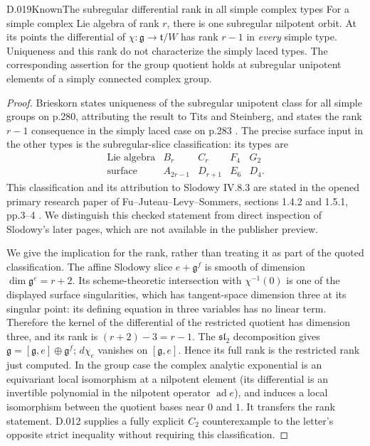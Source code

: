 \begin{saresult}{D.019}{Known}{The subregular differential rank in all simple complex types}
For a simple complex Lie algebra of rank $r$, there is one
subregular nilpotent orbit.  At its points the differential
of $\chi:\mathfrak g\to\mathfrak t/W$ has rank $r-1$ in
\emph{every} simple type.  Uniqueness and this rank do not
characterize the simply laced types.  The corresponding
assertion for the group quotient holds at subregular
unipotent elements of a simply connected complex group.
\end{saresult}
\begin{proof}
Brieskorn states uniqueness of the subregular unipotent class
for all simple groups on p.280, attributing the result to
Tits and Steinberg, and states the rank $r-1$ consequence in
the simply laced case on p.283 \cite{D-Brieskorn}.
The precise surface input in the other types is the
subregular-slice classification: its types are
\[
\begin{array}{c|cccc}
\text{Lie algebra}&B_r&C_r&F_4&G_2\\ \hline
\text{surface}&A_{2r-1}&D_{r+1}&E_6&D_4.
\end{array}
\]
This classification and its attribution to Slodowy IV.8.3
are stated in the opened primary research paper of
Fu--Juteau--Levy--Sommers, sections 1.4.2 and 1.5.1,
pp.3--4 \cite{D-FJLS}.  We distinguish this checked
statement from direct inspection of Slodowy's later pages,
which are not available in the publisher preview.

We give the implication for the rank, rather than treating
it as part of the quoted classification.  The affine
Slodowy slice $e+\mathfrak g^f$ is smooth of dimension
$\dim\mathfrak g^e=r+2$.  Its scheme-theoretic intersection
with $\chi^{-1}(0)$ is one of the displayed surface
singularities, which has tangent-space dimension three at
its singular point: its defining equation in three
variables has no linear term.  Therefore the kernel of
the differential of the restricted quotient has dimension
three, and its rank is $(r+2)-3=r-1$.
The $\mathfrak{sl}_2$ decomposition gives
$\mathfrak g=[\mathfrak g,e]\oplus\mathfrak g^f$;
$d\chi_e$ vanishes on $[\mathfrak g,e]$.  Hence its full
rank is the restricted rank just computed.  In the group
case the complex analytic exponential is an equivariant
local isomorphism at a nilpotent element (its differential
is an invertible polynomial in the nilpotent operator
$\operatorname{ad}e$), and induces a local isomorphism
between the quotient bases near $0$ and $1$.  It transfers
the rank statement.  D.012 supplies a fully explicit
$C_2$ counterexample to the letter's opposite strict
inequality without requiring this classification.
\end{proof}

